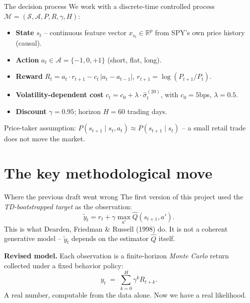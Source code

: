 \documentclass[10pt,aspectratio=169]{beamer}
\newcommand{\R}{\mathbb{R}}
\newcommand{\A}{\mathcal{A}}
\newcommand{\St}{\mathcal{S}}
\begin{document}
\begin{frame}{The decision process}
We work with a discrete-time controlled process
$\mathcal{M} = (\St, \A, P, R, \gamma, H)$:
\begin{itemize}
  \item \textbf{State} $s_t$ -- continuous feature vector
        $x_{s_t} \in \R^p$ from SPY's own price history (causal).
  \item \textbf{Action} $a_t \in \A = \{-1, 0, +1\}$ (short, flat,
        long).
  \item \textbf{Reward}
        $R_t = a_t \cdot r_{t+1} - c_t\,|a_t - a_{t-1}|$,
        \quad $r_{t+1} = \log(P_{t+1}/P_t)$.
  \item \textbf{Volatility-dependent cost}
        $c_t = c_0 + \lambda \cdot \widehat\sigma_t^{(20)}$,
        with $c_0 = 5$bps, $\lambda = 0.5$.
  \item \textbf{Discount} $\gamma = 0.95$; horizon $H = 60$ trading
        days.
\end{itemize}

\medskip
\alert{Price-taker assumption:}
$P(s_{t+1}\mid s_t, a_t) \approx P(s_{t+1}\mid s_t)$ -- a small retail
trade does not move the market.
\end{frame}

\section{The key methodological move}

\begin{frame}{Where the previous draft went wrong}
The first version of this project used the \emph{TD-bootstrapped target}
as the observation:
\begin{equation*}
\tilde y_t = r_t + \gamma \max_{a'} \widehat Q(s_{t+1}, a').
\end{equation*}
This is what Dearden, Friedman \& Russell (1998) do. It is \alert{not a
coherent generative model} -- $\tilde y_t$ depends on the estimator
$\widehat Q$ itself.

\bigskip
\textbf{Revised model.} Each observation is a finite-horizon
\emph{Monte Carlo} return collected under a fixed behavior policy:
\begin{equation}
\boxed{\;y_t \;=\; \sum_{k=0}^{H} \gamma^k R_{t+k}.\;}
\end{equation}
A real number, computable from the data alone. Now we have a real
likelihood.
\end{frame}
\end{document}
